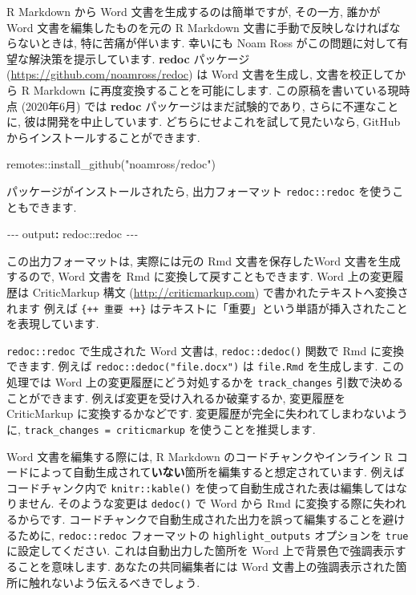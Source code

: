 \documentclass[
  11pt,
  lualatex,ja=standard,jafont=noto]{bxjsreport}
\newenvironment{Shaded}{\begin{snugshade}}{\end{snugshade}}
\newcommand{\AttributeTok}[1]{\textcolor[rgb]{0.77,0.63,0.00}{#1}}
\newcommand{\FunctionTok}[1]{\textcolor[rgb]{0.00,0.00,0.00}{#1}}
\newcommand{\KeywordTok}[1]{\textcolor[rgb]{0.13,0.29,0.53}{\textbf{#1}}}
\newcommand{\NormalTok}[1]{#1}
\newcommand{\PreprocessorTok}[1]{\textcolor[rgb]{0.56,0.35,0.01}{\textit{#1}}}
\newcommand{\SpecialCharTok}[1]{\textcolor[rgb]{0.00,0.00,0.00}{#1}}
\newcommand{\StringTok}[1]{\textcolor[rgb]{0.31,0.60,0.02}{#1}}
\begin{document}
R Markdown から Word 文書を生成するのは簡単ですが, その一方, 誰かが Word 文書を編集したものを元の R Markdown 文書に手動で反映しなければならないときは, 特に苦痛が伴います. 幸いにも Noam Ross がこの問題に対して有望な解決策を提示しています. \textbf{redoc} パッケージ (\url{https://github.com/noamross/redoc}) は Word 文書を生成し, 文書を校正してから R Markdown に再度変換することを可能にします. この原稿を書いている現時点 (2020年6月) では \textbf{redoc} パッケージはまだ試験的であり, さらに不運なことに, 彼は開発を中止しています. どちらにせよこれを試して見たいなら, GitHub からインストールすることができます.

\begin{Shaded}
\begin{Highlighting}[]
\NormalTok{remotes}\SpecialCharTok{::}\FunctionTok{install\_github}\NormalTok{(}\StringTok{"noamross/redoc"}\NormalTok{)}
\end{Highlighting}
\end{Shaded}

パッケージがインストールされたら, 出力フォーマット \texttt{redoc::redoc} を使うこともできます.

\begin{Shaded}
\begin{Highlighting}[]
\PreprocessorTok{{-}{-}{-}}
\FunctionTok{output}\KeywordTok{:}\AttributeTok{ redoc::redoc}
\PreprocessorTok{{-}{-}{-}}
\end{Highlighting}
\end{Shaded}

この出力フォーマットは, 実際には元の Rmd 文書を保存したWord 文書を生成するので, Word 文書を Rmd に変換して戻すこともできます. Word 上の変更履歴は CriticMarkup 構文 (\url{http://criticmarkup.com}) で書かれたテキストへ変換されます 例えば \texttt{\{++ 重要 ++\}} はテキストに「重要」という単語が挿入されたことを表現しています.

\texttt{redoc::redoc} で生成された Word 文書は, \texttt{redoc::dedoc()} 関数で Rmd に変換できます. 例えば \texttt{redoc::dedoc("file.docx")} は \texttt{file.Rmd} を生成します. この処理では Word 上の変更履歴にどう対処するかを \texttt{track\_changes} 引数で決めることができます. 例えば変更を受け入れるか破棄するか, 変更履歴を CriticMarkup に変換するかなどです. 変更履歴が完全に失われてしまわないように, \texttt{track\_changes = \textquotesingle{}criticmarkup\textquotesingle{}} を使うことを推奨します.

Word 文書を編集する際には, R Markdown のコードチャンクやインライン R コードによって自動生成されて\textbf{いない}箇所を編集すると想定されています. 例えばコードチャンク内で \texttt{knitr::kable()} を使って自動生成された表は編集してはなりません. そのような変更は \texttt{dedoc()} で Word から Rmd に変換する際に失われるからです. コードチャンクで自動生成された出力を誤って編集することを避けるために, \texttt{redoc::redoc} フォーマットの \texttt{highlight\_outputs} オプションを \texttt{true}に設定してください. これは自動出力した箇所を Word 上で背景色で強調表示することを意味します. あなたの共同編集者には Word 文書上の強調表示された箇所に触れないよう伝えるべきでしょう.
\end{document}

